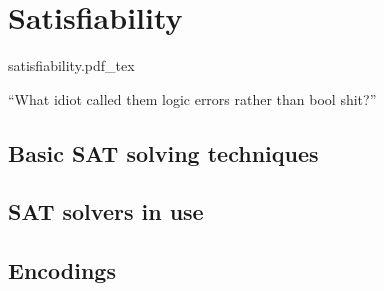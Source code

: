 \chapter{Satisfiability}
\label{ch:sat-solving}
\vspace{50pt}
\begin{center}
  \def\svgwidth{100pt}
  {satisfiability.pdf_tex}
\end{center}

\enquote{What idiot called them logic errors rather than bool shit?}

\section{Basic SAT solving techniques}
\section{SAT solvers in use}
\section{Encodings}
